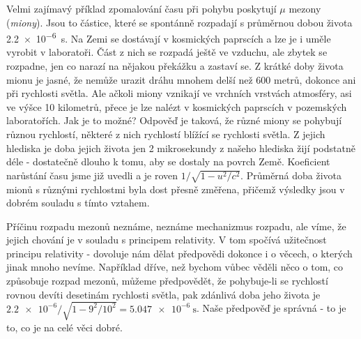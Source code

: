     Velmi zajímavý příklad zpomalování času při pohybu poskytují \(\mu\) mezony (\emph{miony}). 
    Jsou to částice, které se spontánně rozpadají s průměrnou dobou života \SI{2.2e-6}{\s}. Na Zemi 
    se dostávají v kosmických paprscích a lze je i uměle vyrobit v laboratoři. Část z nich se 
    rozpadá ještě ve vzduchu, ale zbytek se rozpadne, jen co narazí na nějakou překážku a zastaví 
    se. Z krátké doby života mionu je jasné, že nemůže urazit dráhu mnohem delší než \num{600} 
    metrů, dokonce ani při rychlosti světla. Ale ačkoli miony vznikají ve vrchních vrstvách 
    atmosféry, asi ve výšce \num{10} kilometrů, přece je lze nalézt v kosmických paprscích v 
    pozemských laboratořích. Jak je to možné? Odpověď je taková, že různé miony se pohybují různou 
    rychlostí, některé z nich rychlostí blížící se rychlosti světla. Z jejich hlediska je doba 
    jejich života jen \num{2} mikrosekundy z našeho hlediska žijí podstatně déle - dostatečně 
    dlouho k tomu, aby se dostaly na povrch Země. Koeficient narůstání času jsme již uvedli a je 
    roven \(1/\sqrt{1 - u^2/c^2}\). Průměrná doba života mionů s různými rychlostmi byla dost 
    přesně změřena, přičemž výsledky jsou v dobrém souladu s tímto vztahem.
    
    Příčinu rozpadu mezonů neznáme, neznáme mechanizmus rozpadu, ale víme, že jejich chování je v 
    souladu s principem relativity. V tom spočívá užitečnost principu relativity - dovoluje nám 
    dělat předpovědi dokonce i o věcech, o kterých jinak mnoho nevíme. Například dříve, než bychom 
    vůbec věděli něco o tom, co způsobuje rozpad mezonů, můžeme předpovědět, že pohybuje-li se 
    rychlostí rovnou devíti desetinám rychlosti světla, pak zdánlivá doba jeho života
    je \(\num{2.2e-6}/\sqrt{1 - 9^2/10^2} = \SI{5.047e-6}{\s}\). Naše předpověď je správná - to je 
    to, co je na celé věci dobré.
    
